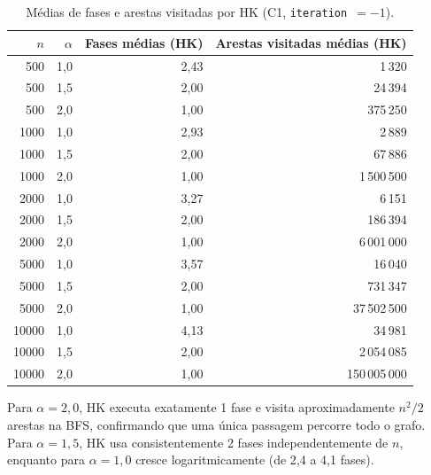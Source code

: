 \documentclass{infufrgs}
\begin{document}
\begin{table}[H]
\centering
\caption{Médias de fases e arestas visitadas por HK (C1, \texttt{iteration}~$=-1$).}
\label{tab:c1-ops}
\begin{tabular}{rrrr}
\toprule
$n$ & $\alpha$ & Fases médias (HK) & Arestas visitadas médias (HK) \\
\midrule
500   & 1{,}0 & 2{,}43 &         1\,320 \\
500   & 1{,}5 & 2{,}00 &        24\,394 \\
500   & 2{,}0 & 1{,}00 &       375\,250 \\
1000  & 1{,}0 & 2{,}93 &         2\,889 \\
1000  & 1{,}5 & 2{,}00 &        67\,886 \\
1000  & 2{,}0 & 1{,}00 &     1\,500\,500 \\
2000  & 1{,}0 & 3{,}27 &         6\,151 \\
2000  & 1{,}5 & 2{,}00 &       186\,394 \\
2000  & 2{,}0 & 1{,}00 &     6\,001\,000 \\
5000  & 1{,}0 & 3{,}57 &        16\,040 \\
5000  & 1{,}5 & 2{,}00 &       731\,347 \\
5000  & 2{,}0 & 1{,}00 &    37\,502\,500 \\
10000 & 1{,}0 & 4{,}13 &        34\,981 \\
10000 & 1{,}5 & 2{,}00 &     2\,054\,085 \\
10000 & 2{,}0 & 1{,}00 & 150\,005\,000 \\
\bottomrule
\end{tabular}
\end{table}

Para $\alpha = 2{,}0$, HK executa exatamente 1 fase e visita aproximadamente $n^2/2$ arestas na BFS, confirmando que uma única passagem percorre todo o grafo. Para $\alpha = 1{,}5$, HK usa consistentemente 2 fases independentemente de $n$, enquanto para $\alpha = 1{,}0$ cresce logaritmicamente (de 2{,}4 a 4{,}1 fases).
\end{document}
